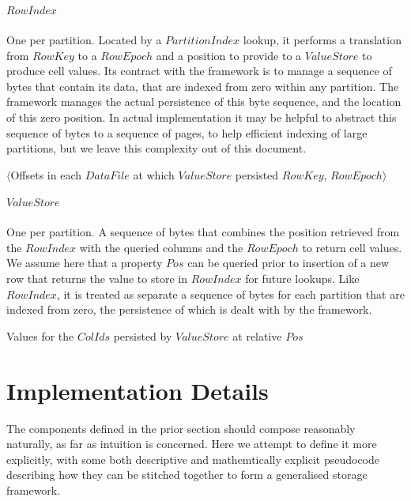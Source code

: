 \documentclass[fleqn]{article}
\begin{document}
\clearpage
\subparagraph{$RowIndex$}
\subparagraph{}
    One per partition. Located by a $PartitionIndex$ lookup, it performs  a translation from $RowKey$ to 
    a $RowEpoch$ and a position to provide to a $ValueStore$ to produce cell values. Its contract with the 
    framework is to manage a sequence of bytes that contain its data, that are indexed from zero within 
    any partition. The framework manages the actual persistence of this byte sequence, and the location of 
    this zero position. In actual implementation it may be helpful to abstract this sequence of bytes to
    a sequence of pages, to help efficient indexing of large partitions, but we leave this complexity out
    of this document.
    \\
    \begin{algorithmic}[2]
    \scriptsize
    \Statex \Return $\langle$Offsets in each $DataFile$ at which $ValueStore$ persisted $RowKey$, $RowEpoch \rangle$
    \EndFunction
    \end{algorithmic}

\subparagraph{$ValueStore$}
\subparagraph{}
    One per partition. A sequence of bytes that combines the position retrieved from the $RowIndex$ with the 
    queried columns and the $RowEpoch$ to return cell values. We assume here that a property $Pos$ can be 
    queried prior to insertion of a new row that returns the value to store in $RowIndex$ for future lookups. 
    Like $RowIndex$, it is treated as separate a sequence of bytes for each partition that are indexed from zero,
    the persistence of which is dealt with by the framework.
    \\
    \begin{algorithmic}[2]
    \scriptsize
    \Statex \Return Values for the $ColIds$ persisted by $ValueStore$ at relative $Pos$
    \EndFunction
    \end{algorithmic}

\paragraph{}
\section{Implementation Details}
\small
The components defined in the prior section should compose reasonably naturally, as far as intuition
is concerned. Here we attempt to define it more explicitly, with some both descriptive and mathemtically
explicit pseudocode describing how they can be stitched together to form a generalised storage framework.
\\
\end{document}
